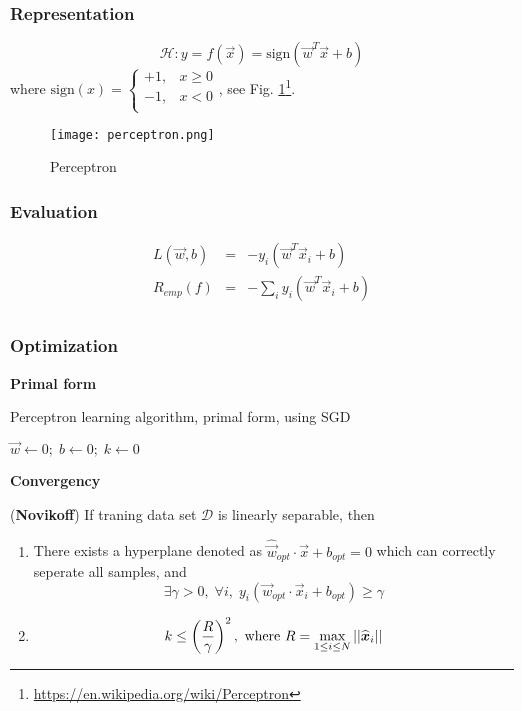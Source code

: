 \subsubsection{Representation}
\begin{equation}
\mathcal{H}:y=f(\vec{x})=\text{sign}(\vec{w}^T\vec{x}+b)
\end{equation}
where $\text{sign}(x)=\begin{cases}+1, & x \geq 0\\-1, & x<0\\\end{cases}$, see Fig. \ref{fig:perceptron}\footnote{\url{https://en.wikipedia.org/wiki/Perceptron}}.

\begin{figure}[hbtp]
\centering
    \texttt{[image: perceptron.png]}
\caption{Perceptron}
\label{fig:perceptron} 
\end{figure}


\subsubsection{Evaluation}
\begin{eqnarray}
L(\vec{w},b)&=&-y_i(\vec{w}^T\vec{x}_i+b)\\
R_{emp}(f)&=&-\sum\limits_i y_i(\vec{w}^T\vec{x}_i+b)\\
\end{eqnarray}


\subsubsection{Optimization}
\textbf{Primal form}
\begin{algorithm}[htbp]
\caption{Perceptron learning algorithm, primal form, using SGD}
  
    $\vec{w} \leftarrow 0;\; b \leftarrow 0;\; k \leftarrow 0$\;
\end{algorithm}

\textbf{Convergency}
\begin{theorem}
(\textbf{Novikoff}) If traning data set $\mathcal{D}$ is linearly separable, then
\begin{enumerate}
\item There exists a hyperplane denoted as $\widehat{\vec{w}}_{opt} \cdot \vec{x}+b_{opt}=0$ which can correctly seperate all samples, and 
\begin{equation}
\exists\gamma>0,\; \forall i, \; y_i(\vec{w}_{opt} \cdot \vec{x}_i+b_{opt}) \geq \gamma
\end{equation}
\item \begin{equation}k \leq \left(\dfrac{R}{\gamma}\right)^2,\text{ where } R=\max\limits_{1 \leq i \leq N} \abs{\abs{\widehat{\vec{x}}_i}}
\end{equation}
\end{enumerate}
\end{theorem}

